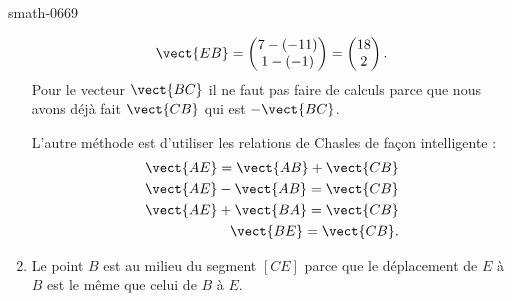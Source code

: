 \begin{corrige}{smath-0669}
\begin{enumerate}
            \begin{equation}
                \vect{ EB }=\begin{pmatrix}
                    7-(-11)    \\ 
                    1-(-1)    
                \end{pmatrix}=\begin{pmatrix}
                    18    \\ 
                    2    
                \end{pmatrix}.
            \end{equation}
            Pour le vecteur \( \vect{ BC }\) il ne faut pas faire de calculs parce que nous avons déjà fait \( \vect{ CB }\) qui est \( -\vect{ BC }\).

            L'autre méthode est d'utiliser les relations de Chasles de façon intelligente :
            \begin{subequations}
                \begin{align}
                    \vect{ AE }=\vect{ AB }+\vect{ CB }\\
                    \vect{ AE }-\vect{ AB }=\vect{ CB }\\
                    \vect{ AE }+\vect{ BA }=\vect{ CB }\\
                    \vect{ BE }=\vect{ CB }.
                \end{align}
            \end{subequations}
        \item
            Le point \( B\) est au milieu du segment \( [CE]\) parce que le déplacement de \( E\) à \( B\) est le même que celui de \( B\) à \( E\).
    \end{enumerate}

\end{corrige}
